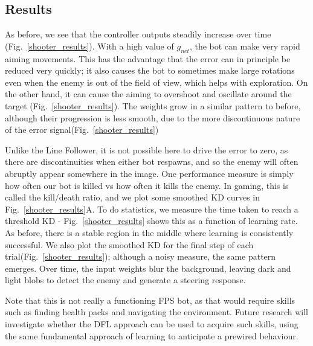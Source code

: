\documentclass{llncs}
\begin{document}
\subsection{Results}

As before, we see that the controller outputs steadily increase over time (Fig.~\ref{shooter_results}). With a high value of $g_{net}$, the bot can make very rapid aiming movements. This has the advantage that the error can in principle be reduced very quickly; it also causes the bot to sometimes make large rotations even when the enemy is out of the field of view, which helps with exploration. On the other hand, it can cause the aiming to overshoot and oscillate around the target (Fig.~\ref{shooter_results}). 
The weights grow in a similar pattern to before, although their progression is less smooth, due to the more discontinuous nature of the error signal(Fig.~\ref{shooter_results})

Unlike the Line Follower, it is not possible here to drive the error to zero, as there are discontinuities when either bot respawns, and so the enemy will often abruptly appear somewhere in the image. One performance measure is simply how often our bot is killed vs how often it kills the enemy. In gaming, this is called the kill/death ratio, and we plot some smoothed KD curves in Fig.~\ref{shooter_results}A. To do statistics, we measure the time taken to reach a threshold KD - Fig.~\ref{shooter_results} shows this as a function of learning rate. As before, there is a stable region in the middle where learning is consistently successful. We also plot the smoothed KD for the final step of each trial(Fig.~\ref{shooter_results}); although a noisy measure, the same pattern emerges. Over time, the input weights blur the background, leaving dark and light blobs to detect the enemy and generate a steering response. 

Note that this is not really a functioning FPS bot, as that would require skills such as finding health packs and navigating the environment. Future research will investigate whether the DFL approach can be used to acquire such skills, using the same fundamental approach of learning to anticipate a prewired behaviour. 
\end{document}
